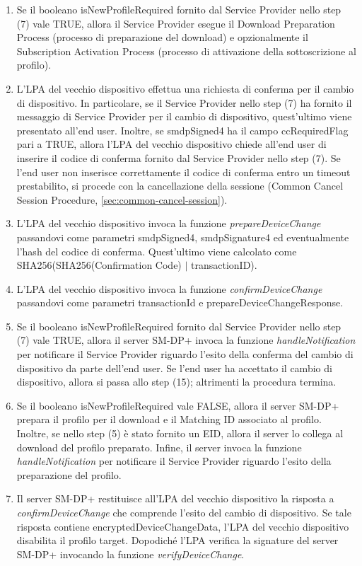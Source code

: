 \documentclass[10pt, oneside]{book}
\begin{document}
\begin{enumerate}
\item Se il booleano isNewProfileRequired fornito dal Service Provider nello step (7) vale TRUE, allora il Service Provider esegue il Download Preparation Process (processo di preparazione del download) e opzionalmente il Subscription Activation Process (processo di attivazione della sottoscrizione al profilo).
\item L'LPA del vecchio dispositivo effettua una richiesta di conferma per il cambio di dispositivo. In particolare, se il Service Provider nello step (7) ha fornito il messaggio di Service Provider per il cambio di dispositivo, quest'ultimo viene presentato all'end user. Inoltre, se smdpSigned4 ha il campo ccRequiredFlag pari a TRUE, allora l'LPA del vecchio dispositivo chiede all'end user di inserire il codice di conferma fornito dal Service Provider nello step (7). Se l'end user non inserisce correttamente il codice di conferma entro un timeout prestabilito, si procede con la cancellazione della sessione (Common Cancel Session Procedure, \ref{sec:common-cancel-session}).
\item L'LPA del vecchio dispositivo invoca la funzione \textit{prepareDeviceChange} passandovi come parametri smdpSigned4, smdpSignature4 ed eventualmente l'hash del codice di conferma. Quest'ultimo viene calcolato come SHA256(SHA256(Confirmation Code) $\vert$ transactionID).
\item L'LPA del vecchio dispositivo invoca la funzione \textit{confirmDeviceChange} passandovi come parametri transactionId e prepareDeviceChangeResponse.
\item Se il booleano isNewProfileRequired fornito dal Service Provider nello step (7) vale TRUE, allora il server SM-DP+ invoca la funzione \textit{handleNotification} per notificare il Service Provider riguardo l'esito della conferma del cambio di dispositivo da parte dell'end user. Se l'end user ha accettato il cambio di dispositivo, allora si passa allo step (15); altrimenti la procedura termina.
\item Se il booleano isNewProfileRequired vale FALSE, allora il server SM-DP+ prepara il profilo per il download e il Matching ID associato al profilo. Inoltre, se nello step (5) è stato fornito un EID, allora il server lo collega al download del profilo preparato. Infine, il server invoca la funzione \textit{handleNotification} per notificare il Service Provider riguardo l'esito della preparazione del profilo.
\item Il server SM-DP+ restituisce all'LPA del vecchio dispositivo la risposta a \textit{confirmDeviceChange} che comprende l'esito del cambio di dispositivo. Se tale risposta contiene encryptedDeviceChangeData, l'LPA del vecchio dispositivo disabilita il profilo target. Dopodiché l'LPA verifica la signature del server SM-DP+ invocando la funzione \textit{verifyDeviceChange}.

\end{enumerate}
\end{document}
